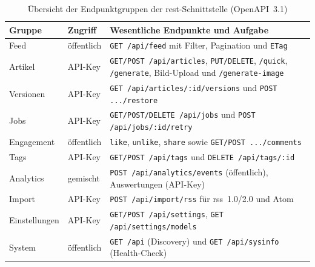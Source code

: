 \begin{table}
    \centering
    \small
    \begin{tabularx}{\textwidth}{l l >{\raggedright\arraybackslash}X}
        \toprule
        \textbf{Gruppe} & \textbf{Zugriff} & \textbf{Wesentliche Endpunkte und Aufgabe} \\
        \midrule
        Feed & öffentlich & \texttt{GET /api/feed} mit Filter, Pagination und \texttt{ETag} \\
        Artikel & API-Key & \texttt{GET/POST /api/articles}, \texttt{PUT/DELETE}, \texttt{/quick}, \texttt{/generate}, Bild-Upload und \texttt{/generate-image} \\
        Versionen & API-Key & \texttt{GET /api/articles/:id/versions} und \texttt{POST .../restore} \\
        Jobs & API-Key & \texttt{GET/POST/DELETE /api/jobs} und \texttt{POST /api/jobs/:id/retry} \\
        Engagement & öffentlich & \texttt{like}, \texttt{unlike}, \texttt{share} sowie \texttt{GET/POST .../comments} \\
        Tags & API-Key & \texttt{GET/POST /api/tags} und \texttt{DELETE /api/tags/:id} \\
        Analytics & gemischt & \texttt{POST /api/analytics/events} (öffentlich), Auswertungen (API-Key) \\
        Import & API-Key & \texttt{POST /api/import/rss} für \gls{rss}~1.0/2.0 und Atom \\
        Einstellungen & API-Key & \texttt{GET/POST /api/settings}, \texttt{GET /api/settings/models} \\
        System & öffentlich & \texttt{GET /api} (Discovery) und \texttt{GET /api/sysinfo} (Health-Check) \\
        \bottomrule
    \end{tabularx}
    \caption{Übersicht der Endpunktgruppen der \gls{rest}-Schnittstelle (OpenAPI~3.1)}
    \label{tab:backend:endpoints}
\end{table}

